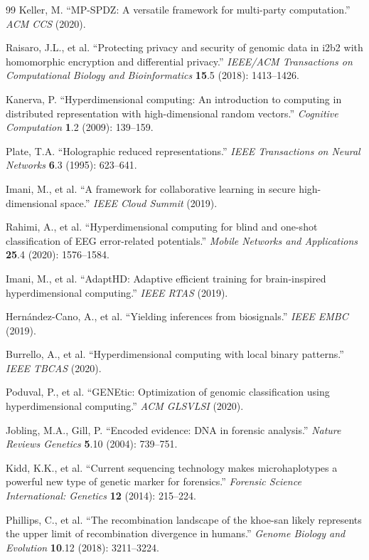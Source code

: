 \documentclass[11pt,letterpaper]{article}
\begin{document}
\begin{thebibliography}{99}
 Keller, M. ``MP-SPDZ: A versatile framework for multi-party computation.'' \textit{ACM CCS} (2020).

 Raisaro, J.L., et al. ``Protecting privacy and security of genomic data in i2b2 with homomorphic encryption and differential privacy.'' \textit{IEEE/ACM Transactions on Computational Biology and Bioinformatics} \textbf{15}.5 (2018): 1413--1426.

 Kanerva, P. ``Hyperdimensional computing: An introduction to computing in distributed representation with high-dimensional random vectors.'' \textit{Cognitive Computation} \textbf{1}.2 (2009): 139--159.

 Plate, T.A. ``Holographic reduced representations.'' \textit{IEEE Transactions on Neural Networks} \textbf{6}.3 (1995): 623--641.

 Imani, M., et al. ``A framework for collaborative learning in secure high-dimensional space.'' \textit{IEEE Cloud Summit} (2019).

 Rahimi, A., et al. ``Hyperdimensional computing for blind and one-shot classification of EEG error-related potentials.'' \textit{Mobile Networks and Applications} \textbf{25}.4 (2020): 1576--1584.

 Imani, M., et al. ``AdaptHD: Adaptive efficient training for brain-inspired hyperdimensional computing.'' \textit{IEEE RTAS} (2019).

 Hernández-Cano, A., et al. ``Yielding inferences from biosignals.'' \textit{IEEE EMBC} (2019).

 Burrello, A., et al. ``Hyperdimensional computing with local binary patterns.'' \textit{IEEE TBCAS} (2020).

 Poduval, P., et al. ``GENEtic: Optimization of genomic classification using hyperdimensional computing.'' \textit{ACM GLSVLSI} (2020).

 Jobling, M.A., Gill, P. ``Encoded evidence: DNA in forensic analysis.'' \textit{Nature Reviews Genetics} \textbf{5}.10 (2004): 739--751.

 Kidd, K.K., et al. ``Current sequencing technology makes microhaplotypes a powerful new type of genetic marker for forensics.'' \textit{Forensic Science International: Genetics} \textbf{12} (2014): 215--224.

 Phillips, C., et al. ``The recombination landscape of the khoe-san likely represents the upper limit of recombination divergence in humans.'' \textit{Genome Biology and Evolution} \textbf{10}.12 (2018): 3211--3224.


\end{thebibliography}
\end{document}
